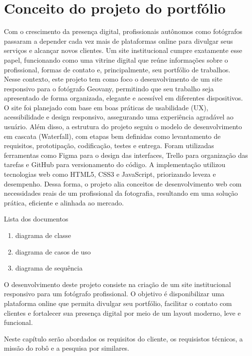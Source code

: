 \chapter{Conceito do projeto do portfólio}
\label{chap:fundteor}
Com o crescimento da presença digital, profissionais autônomos como fotógrafos passaram a depender cada vez mais de plataformas online para divulgar seus serviços e alcançar novos clientes. Um site institucional cumpre exatamente esse papel, funcionando como uma vitrine digital que reúne informações sobre o profissional, formas de contato e, principalmente, seu portfólio de trabalhos. Nesse contexto, este projeto tem como foco o desenvolvimento de um site responsivo para o fotógrafo Geovany, permitindo que seu trabalho seja apresentado de forma organizada, elegante e acessível em diferentes dispositivos. O site foi planejado com base em boas práticas de usabilidade (UX), acessibilidade e design responsivo, assegurando uma experiência agradável ao usuário. Além disso, a estrutura do projeto seguiu o modelo de desenvolvimento em cascata (Waterfall), com etapas bem definidas como levantamento de requisitos, prototipação, codificação, testes e entrega. Foram utilizadas ferramentas como Figma para o design das interfaces, Trello para organização das tarefas e GitHub para versionamento do código. A implementação utilizou tecnologias web como HTML5, CSS3 e JavaScript, priorizando leveza e desempenho. Dessa forma, o projeto alia conceitos de desenvolvimento web com necessidades reais de um profissional da fotografia, resultando em uma solução prática, eficiente e alinhada ao mercado.

Lista dos documentos
\begin{enumerate}
   \item diagrama de classe
   \item diagrama de casos de uso
   \item diagrama de sequência
\end{enumerate}

O desenvolvimento deste projeto consiste na criação de um site institucional responsivo para um fotógrafo profissional. O objetivo é disponibilizar uma plataforma online que permita divulgar seu portfólio, facilitar o contato com clientes e fortalecer sua presença digital por meio de um layout moderno, leve e funcional.

Neste capítulo serão abordados os requisitos do cliente, os requisistos técnicos, a missão do robô e a pesquisa por similares. 



